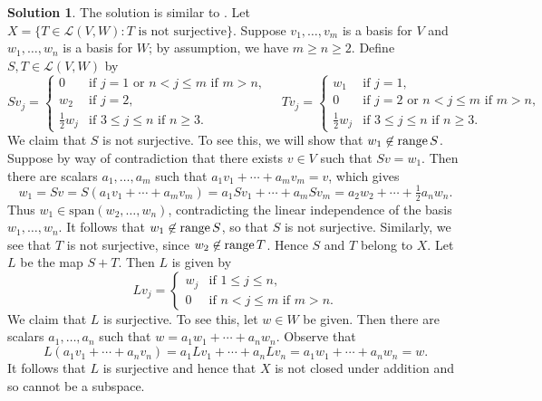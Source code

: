 \documentclass[12pt]{article}
\theoremstyle{definition}
\theoremstyle{exercise}
\theoremstyle{solution}
\newtheorem*{solution}{Solution}
\newcommand{\lmap}{\mathcal{L}}
\newcommand{\Span}{\text{span}}
\newcommand{\Range}{\text{range\,}}
\begin{document}
\begin{solution}
    The solution is similar to . Let \( X = \{ T \in \lmap(V, W) : T \text{ is not surjective} \} \). Suppose \( v_1, \ldots, v_m \) is a basis for \( V \) and \( w_1, \ldots, w_n \) is a basis for \( W \); by assumption, we have \( m \geq n \geq 2 \). Define \( S, T \in \lmap(V, W) \) by
    \[
        Sv_j = \begin{cases}
            0 & \text{if } j = 1 \text{ or } n < j \leq m \text{ if } m > n, \\
            w_2 & \text{if } j = 2, \\
            \tfrac{1}{2} w_j & \text{if } 3 \leq j \leq n \text{ if } n \geq 3.
        \end{cases}
        \quad
        Tv_j = \begin{cases}
            w_1 & \text{if } j = 1, \\
            0 & \text{if } j = 2 \text{ or } n < j \leq m \text{ if } m > n, \\
            \tfrac{1}{2} w_j & \text{if } 3 \leq j \leq n \text{ if } n \geq 3.
        \end{cases}
    \]
    We claim that \( S \) is not surjective. To see this, we will show that \( w_1 \not\in \Range S \). Suppose by way of contradiction that there exists \( v \in V \) such that \( Sv = w_1 \). Then there are scalars \( a_1, \ldots, a_m \) such that \( a_1 v_1 + \cdots + a_m v_m = v \), which gives
    \[
        w_1 = Sv = S(a_1 v_1 + \cdots + a_m v_m) = a_1 S v_1 + \cdots + a_m S v_m = a_2 w_2 + \cdots + \tfrac{1}{2} a_n w_n.
    \]
    Thus \( w_1 \in \Span(w_2, \ldots, w_n) \), contradicting the linear independence of the basis \( w_1, \ldots, w_n \). It follows that \( w_1 \not\in \Range S \), so that \( S \) is not surjective. Similarly, we see that \( T \) is not surjective, since \( w_2 \not\in \Range T \). Hence \( S \) and \( T \) belong to \( X \). Let \( L \) be the map \( S + T \). Then \( L \) is given by
    \[
        Lv_j = \begin{cases}
            w_j & \text{if } 1 \leq j \leq n, \\
            0 & \text{if } n < j \leq m \text{ if } m > n.
        \end{cases}
    \]
    We claim that \( L \) is surjective. To see this, let \( w \in W \) be given. Then there are scalars \( a_1, \ldots, a_n \) such that \( w = a_1 w_1 + \cdots + a_n w_n \). Observe that
    \[
        L(a_1 v_1 + \cdots + a_n v_n) = a_1 Lv_1 + \cdots + a_n Lv_n = a_1 w_1 + \cdots + a_n w_n = w.
    \]
    It follows that \( L \) is surjective and hence that \( X \) is not closed under addition and so cannot be a subspace.
\end{solution}
\end{document}
